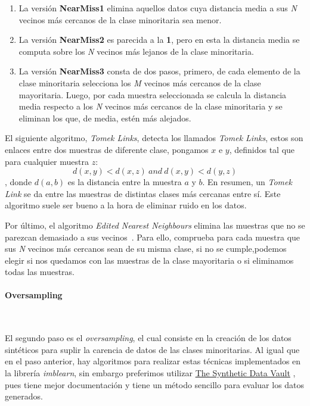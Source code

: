 \begin{enumerate}
    \item La versión \textbf{NearMiss1} elimina aquellos datos cuya distancia media a sus \textit{N} vecinos más cercanos de la clase minoritaria sea menor.
    \item La versión \textbf{NearMiss2} es parecida a la \textbf{1}, pero en esta la distancia media se computa sobre los \textit{N} vecinos más lejanos de la clase minoritaria.
    \item La versión \textbf{NearMiss3} consta de dos pasos, primero, de cada elemento de la clase minoritaria selecciona los \textit{M} vecinos más cercanos de la clase mayoritaria. Luego, por cada muestra seleccionada se calcula la distancia media respecto a los \textit{N} vecinos más cercanos de la clase minoritaria y se eliminan los que, de media, estén más alejados.
\end{enumerate}

El siguiente algoritmo, \textit{Tomek Links}, detecta los llamados \textit{Tomek Links}, estos son enlaces entre dos muestras de diferente clase, pongamos \(x\) e \(y\), definidos tal que para cualquier muestra \(z\): 
\[d(x,y) < d(x,z)\ and\ d(x,y) < d(y,z)\], donde \(d(a, b)\) es la distancia entre la muestra \(a\) y \(b\). En resumen, un \textit{Tomek Link} se da entre las muestras de distintas clases más cercanas entre sí. Este algoritmo suele ser bueno a la hora de eliminar ruido en los datos.

Por último, el algoritmo \textit{Edited Nearest Neighbours} elimina las muestras que no se parezcan demasiado a sus vecinos\ \cite{Wil72}. Para ello, comprueba para cada muestra que sus \textit{N} vecinos más cercanos sean de su misma clase, si no se cumple,podemos elegir si nos quedamos con las muestras de la clase mayoritaria o si eliminamos todas las muestras.


\paragraph{Oversampling}\ \label{sec:oversampling}

El segundo paso es el \textit{oversampling}, el cual consiste en la creación de los datos sintéticos para suplir la carencia de datos de las clases minoritarias. Al igual que en el paso anterior, hay algoritmos para realizar estas técnicas implementados en la librería \textit{imblearn}, sin embargo preferimos utilizar \href{https://sdv.dev/}{The Synthetic Data Vault} \cite{Synthesi69:online}, pues tiene mejor documentación y tiene un método sencillo para evaluar los datos generados. 


